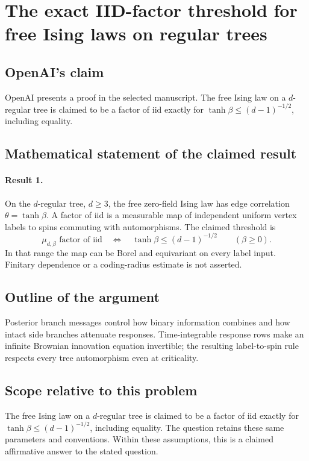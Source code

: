 \documentclass[11pt]{article}
\begin{document}
\section*{The exact IID-factor threshold for free Ising laws on regular trees}

\subsection{OpenAI's claim}
OpenAI presents a proof in the selected manuscript. The free Ising law on a $d$-regular tree is claimed to be a factor of iid exactly for $\tanh\beta\leq(d-1)^{-1/2}$, including equality.

\subsection{Mathematical statement of the claimed result}
\paragraph{Result 1.} On the \(d\)-regular tree, \(d\ge3\), the free zero-field Ising law has edge correlation \(\theta=\tanh\beta\). A factor of iid is a measurable map of independent uniform vertex labels to spins commuting with automorphisms. The claimed threshold is
\[
 \mu_{d,\beta}\text{ factor of iid}\quad\Longleftrightarrow\quad
 \tanh\beta\le(d-1)^{-1/2}\qquad(\beta\ge0).
\]
In that range the map can be Borel and equivariant on every label input. Finitary dependence or a coding-radius estimate is not asserted.

\subsection{Outline of the argument}
Posterior branch messages control how binary information combines and how intact side branches attenuate responses. Time-integrable response rows make an infinite Brownian innovation equation invertible; the resulting label-to-spin rule respects every tree automorphism even at criticality.

\subsection{Scope relative to this problem}
The free Ising law on a $d$-regular tree is claimed to be a factor of iid exactly for $\tanh\beta\leq(d-1)^{-1/2}$, including equality. The question retains these same parameters and conventions. Within these assumptions, this is a claimed affirmative answer to the stated question.
\end{document}
